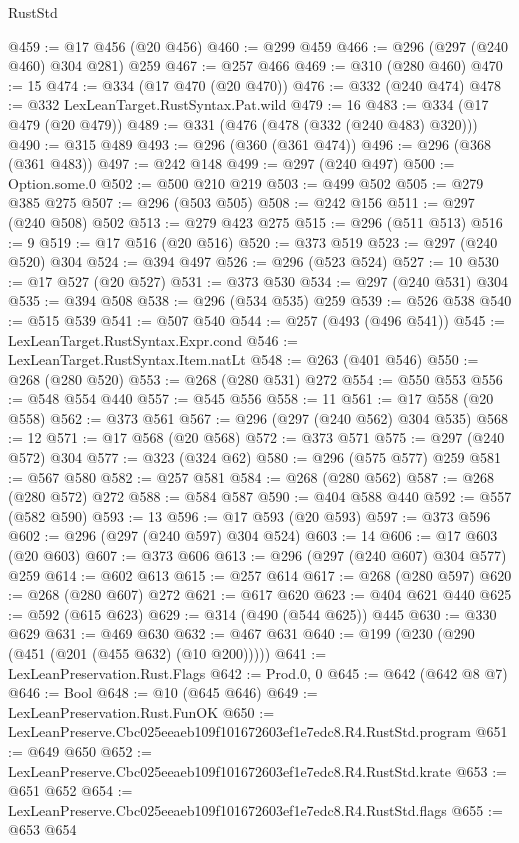 \begin{lexlean}{RustStd}
\begin{coremodule}
@459 := @17 @456 (@20 @456)
@460 := @299 @459
@466 := @296 (@297 (@240 @460) @304 @281) @259
@467 := @257 @466
@469 := @310 (@280 @460)
@470 := 15
@474 := @334 (@17 @470 (@20 @470))
@476 := @332 (@240 @474)
@478 := @332 LexLeanTarget.RustSyntax.Pat.wild
@479 := 16
@483 := @334 (@17 @479 (@20 @479))
@489 := @331 (@476 (@478 (@332 (@240 @483) @320)))
@490 := @315 @489
@493 := @296 (@360 (@361 @474))
@496 := @296 (@368 (@361 @483))
@497 := @242 @148
@499 := @297 (@240 @497)
@500 := Option.some.{0}
@502 := @500 @210 @219
@503 := @499 @502
@505 := @279 @385 @275
@507 := @296 (@503 @505)
@508 := @242 @156
@511 := @297 (@240 @508) @502
@513 := @279 @423 @275
@515 := @296 (@511 @513)
@516 := 9
@519 := @17 @516 (@20 @516)
@520 := @373 @519
@523 := @297 (@240 @520) @304
@524 := @394 @497
@526 := @296 (@523 @524)
@527 := 10
@530 := @17 @527 (@20 @527)
@531 := @373 @530
@534 := @297 (@240 @531) @304
@535 := @394 @508
@538 := @296 (@534 @535) @259
@539 := @526 @538
@540 := @515 @539
@541 := @507 @540
@544 := @257 (@493 (@496 @541))
@545 := LexLeanTarget.RustSyntax.Expr.cond
@546 := LexLeanTarget.RustSyntax.Item.natLt
@548 := @263 (@401 @546)
@550 := @268 (@280 @520)
@553 := @268 (@280 @531) @272
@554 := @550 @553
@556 := @548 @554 @440
@557 := @545 @556
@558 := 11
@561 := @17 @558 (@20 @558)
@562 := @373 @561
@567 := @296 (@297 (@240 @562) @304 @535)
@568 := 12
@571 := @17 @568 (@20 @568)
@572 := @373 @571
@575 := @297 (@240 @572) @304
@577 := @323 (@324 @62)
@580 := @296 (@575 @577) @259
@581 := @567 @580
@582 := @257 @581
@584 := @268 (@280 @562)
@587 := @268 (@280 @572) @272
@588 := @584 @587
@590 := @404 @588 @440
@592 := @557 (@582 @590)
@593 := 13
@596 := @17 @593 (@20 @593)
@597 := @373 @596
@602 := @296 (@297 (@240 @597) @304 @524)
@603 := 14
@606 := @17 @603 (@20 @603)
@607 := @373 @606
@613 := @296 (@297 (@240 @607) @304 @577) @259
@614 := @602 @613
@615 := @257 @614
@617 := @268 (@280 @597)
@620 := @268 (@280 @607) @272
@621 := @617 @620
@623 := @404 @621 @440
@625 := @592 (@615 @623)
@629 := @314 (@490 (@544 @625)) @445
@630 := @330 @629
@631 := @469 @630
@632 := @467 @631
@640 := @199 (@230 (@290 (@451 (@201 (@455 @632) (@10 @200)))))
@641 := LexLeanPreservation.Rust.Flags
@642 := Prod.{0, 0}
@645 := @642 (@642 @8 @7)
@646 := Bool
@648 := @10 (@645 @646)
@649 := LexLeanPreservation.Rust.FunOK
@650 := LexLeanPreserve.Cbc025eeaeb109f101672603ef1e7edc8.R4.RustStd.program
@651 := @649 @650
@652 := LexLeanPreserve.Cbc025eeaeb109f101672603ef1e7edc8.R4.RustStd.krate
@653 := @651 @652
@654 := LexLeanPreserve.Cbc025eeaeb109f101672603ef1e7edc8.R4.RustStd.flags
@655 := @653 @654

\end{coremodule}
\end{lexlean}
